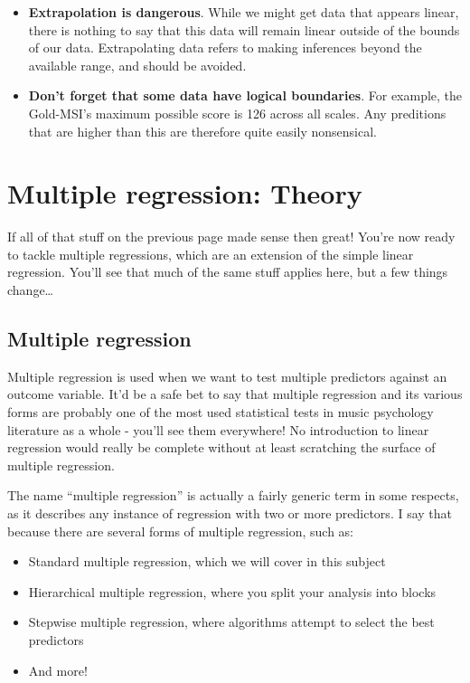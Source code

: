 \documentclass[
]{book}
\providecommand{\tightlist}{%
  \setlength{\itemsep}{0pt}\setlength{\parskip}{0pt}}
\begin{document}
\begin{itemize}
\tightlist
\item
  \textbf{Extrapolation is dangerous}. While we might get data that appears linear, there is nothing to say that this data will remain linear outside of the bounds of our data. Extrapolating data refers to making inferences beyond the available range, and should be avoided.
\item
  \textbf{Don't forget that some data have logical boundaries}. For example, the Gold-MSI's maximum possible score is 126 across all scales. Any preditions that are higher than this are therefore quite easily nonsensical.
\end{itemize}

\hypertarget{multiple-regression-theory}{%
\section{Multiple regression: Theory}\label{multiple-regression-theory}}

If all of that stuff on the previous page made sense then great! You're now ready to tackle multiple regressions, which are an extension of the simple linear regression. You'll see that much of the same stuff applies here, but a few things change\ldots{}

\hypertarget{multiple-regression}{%
\subsection{Multiple regression}\label{multiple-regression}}

Multiple regression is used when we want to test multiple predictors against an outcome variable. It'd be a safe bet to say that multiple regression and its various forms are probably one of the most used statistical tests in music psychology literature as a whole - you'll see them everywhere! No introduction to linear regression would really be complete without at least scratching the surface of multiple regression.

The name ``multiple regression'' is actually a fairly generic term in some respects, as it describes any instance of regression with two or more predictors. I say that because there are several forms of multiple regression, such as:

\begin{itemize}
\tightlist
\item
  Standard multiple regression, which we will cover in this subject
\item
  Hierarchical multiple regression, where you split your analysis into blocks
\item
  Stepwise multiple regression, where algorithms attempt to select the best predictors
\item
  And more!
\end{itemize}
\end{document}
